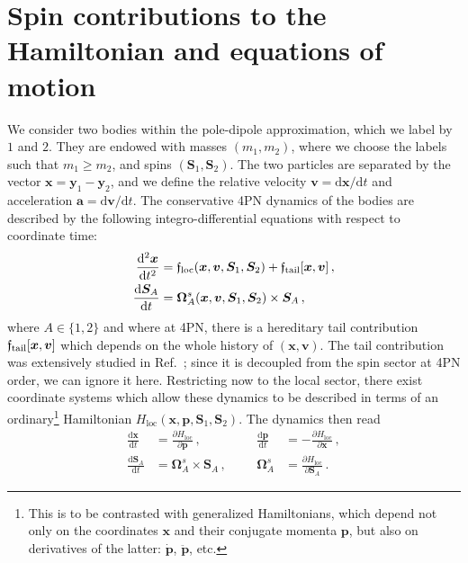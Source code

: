 \documentclass[prd,superscriptaddress,preprintnumbers,tightenlines,nofootinbib, eqsecnum]{revtex4-2}
\renewcommand{\dd}{\mathrm{d}}
\begin{document}
\section{Spin contributions to the Hamiltonian and equations of motion}
\label{sec:hamiltonian}


We consider two bodies within the pole-dipole approximation, which we label by $1$ and $2$. They are endowed with masses $(m_1,m_2)$, where we choose the labels such that $m_1\ge m_2$, and spins $(\bm{S}_1,\bm{S}_2)$. The two particles are separated by the vector $\bm{x}=\bm{y}_1-\bm{y}_2$, and we define the relative velocity $\bm{v}=\dd \bm{x}/\dd t$ and acceleration $\bm{a}=\dd \bm{v}/\dd t$. The conservative 4PN dynamics of the bodies are described by the following integro-differential equations with respect to coordinate time:
\begin{subequations}\label{eq:eom_precession_equations}\begin{align} 
    \frac{\dd^2 \bm{x}}{\dd t^2} &=\frak{f}_\text{loc}(\bm{x},\bm{v},\bm{S}_1,\bm{S}_2)+\frak{f}_\text{tail}[\bm{x},\bm{v}] \,, \\
    \frac{\dd \bm{S}_A}{\dd t}&= \bm{\Omega}^s_A(\bm{x},\bm{v},\bm{S}_1,\bm{S}_2)\times \bm{S}_A \,,
\end{align}\end{subequations}
where $A\in\{1,2\}$ and where at 4PN, there is a hereditary tail contribution $\frak{f}_\text{tail}[\bm{x},\bm{v}]$   which depends on the whole history of $(\bm{x},\bm{v})$. The tail contribution was extensively studied in Ref.~\cite{Trestini:2025yyc}; since it is decoupled from the spin sector at 4PN order, we can ignore it here. Restricting now to the local sector, there exist coordinate systems which allow these dynamics to be described in terms of an ordinary\footnote{
This is to be contrasted with generalized Hamiltonians, which depend not only on the coordinates $\bm{x}$ and their conjugate momenta  $\bm{p}$, but also on derivatives of the latter:  $\dot{\bm{p}}$, $\ddot{\bm{p}}$, etc.}
%
Hamiltonian $H_\text{loc}(\bm{x},\bm{p},\bm{S}_1,\bm{S}_2)$. The dynamics then read
\begin{subequations}\label{eq:local_Hamilton_equations}
    \begin{align} 
    \frac{\dd \bm{x}}{\dd t} &= \frac{\partial H_\text{loc}}{\partial \bm{p}}\,, &&&
    \frac{\dd \bm{p}}{\dd t} &= -\frac{\partial H_\text{loc}}{\partial \bm{x}} \,,\\
    \frac{\dd \bm{S}_A}{\dd t} &= \bm{\Omega}^s_A \times \bm{S}_A\,,&&& \bm{\Omega}^s_A&= \frac{\partial H_\text{loc}}{\partial \bm{S}_A}\,.
\end{align}
\end{subequations}
\end{document}
